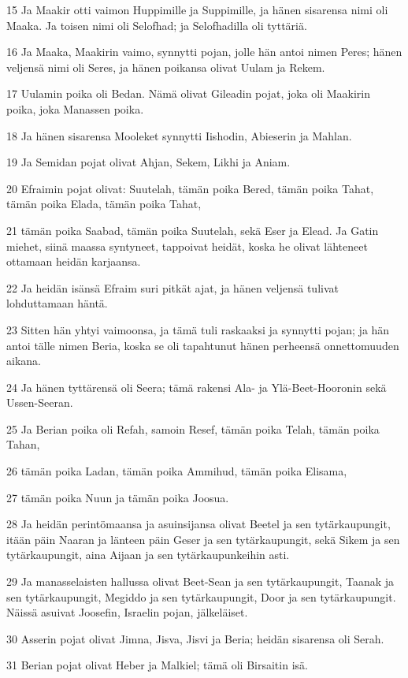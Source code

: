 \par 15 Ja Maakir otti vaimon Huppimille ja Suppimille, ja hänen sisarensa nimi oli Maaka. Ja toisen nimi oli Selofhad; ja Selofhadilla oli tyttäriä.
\par 16 Ja Maaka, Maakirin vaimo, synnytti pojan, jolle hän antoi nimen Peres; hänen veljensä nimi oli Seres, ja hänen poikansa olivat Uulam ja Rekem.
\par 17 Uulamin poika oli Bedan. Nämä olivat Gileadin pojat, joka oli Maakirin poika, joka Manassen poika.
\par 18 Ja hänen sisarensa Mooleket synnytti Iishodin, Abieserin ja Mahlan.
\par 19 Ja Semidan pojat olivat Ahjan, Sekem, Likhi ja Aniam.
\par 20 Efraimin pojat olivat: Suutelah, tämän poika Bered, tämän poika Tahat, tämän poika Elada, tämän poika Tahat,
\par 21 tämän poika Saabad, tämän poika Suutelah, sekä Eser ja Elead. Ja Gatin miehet, siinä maassa syntyneet, tappoivat heidät, koska he olivat lähteneet ottamaan heidän karjaansa.
\par 22 Ja heidän isänsä Efraim suri pitkät ajat, ja hänen veljensä tulivat lohduttamaan häntä.
\par 23 Sitten hän yhtyi vaimoonsa, ja tämä tuli raskaaksi ja synnytti pojan; ja hän antoi tälle nimen Beria, koska se oli tapahtunut hänen perheensä onnettomuuden aikana.
\par 24 Ja hänen tyttärensä oli Seera; tämä rakensi Ala- ja Ylä-Beet-Hooronin sekä Ussen-Seeran.
\par 25 Ja Berian poika oli Refah, samoin Resef, tämän poika Telah, tämän poika Tahan,
\par 26 tämän poika Ladan, tämän poika Ammihud, tämän poika Elisama,
\par 27 tämän poika Nuun ja tämän poika Joosua.
\par 28 Ja heidän perintömaansa ja asuinsijansa olivat Beetel ja sen tytärkaupungit, itään päin Naaran ja länteen päin Geser ja sen tytärkaupungit, sekä Sikem ja sen tytärkaupungit, aina Aijaan ja sen tytärkaupunkeihin asti.
\par 29 Ja manasselaisten hallussa olivat Beet-Sean ja sen tytärkaupungit, Taanak ja sen tytärkaupungit, Megiddo ja sen tytärkaupungit, Door ja sen tytärkaupungit. Näissä asuivat Joosefin, Israelin pojan, jälkeläiset.
\par 30 Asserin pojat olivat Jimna, Jisva, Jisvi ja Beria; heidän sisarensa oli Serah.
\par 31 Berian pojat olivat Heber ja Malkiel; tämä oli Birsaitin isä.
